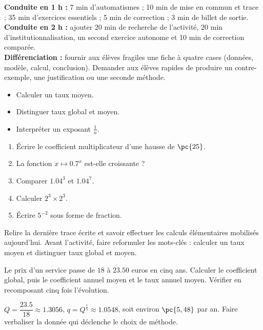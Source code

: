 \ifmxteacher
\begin{method}
\textbf{Conduite en 1 h :} 7 min d'automatismes ; 10 min de mise en commun et trace ; 35 min d'exercices essentiels ; 5 min de correction ; 3 min de billet de sortie.\\
\textbf{Conduite en 2 h :} ajouter 20 min de recherche de l'activité, 20 min d'institutionnalisation, un second exercice autonome et 10 min de correction comparée.\\
\textbf{Différenciation :} fournir aux élèves fragiles une fiche à quatre cases (données, modèle, calcul, conclusion). Demander aux élèves rapides de produire un contre-exemple, une justification ou une seconde méthode.
\end{method}
\fi
{}
\begin{objectives}\begin{itemize}\item Calculer un taux moyen.\item Distinguer taux global et moyen.\item Interpréter un exposant $\frac1n$.\end{itemize}\end{objectives}
\begin{fluency}\begin{enumerate}\item Écrire le coefficient multiplicateur d'une hausse de $\pc{25}$. \item La fonction $x\mapsto\num{0,7}^x$ est-elle croissante ? \item Comparer $\num{1,04}^3$ et $\num{1,04}^7$. \item Calculer $2^3\times2^3$. \item Écrire $5^{-2}$ sous forme de fraction. \end{enumerate}\end{fluency}
\begin{prerequisites}Relire la dernière trace écrite et savoir effectuer les calculs élémentaires mobilisés aujourd'hui. Avant l'activité, faire reformuler les mots-clés : calculer un taux moyen et distinguer taux global et moyen.\end{prerequisites}

\begin{activity}
Le prix d'un service passe de $18$ à $\num{23,50}$ euros en cinq ans. Calculer le coefficient global, puis le coefficient annuel moyen et le taux annuel moyen. Vérifier en recomposant cinq fois l'évolution.

\end{activity}
\begin{solution}$Q=\dfrac{\num{23,5}}{18}\approx\num{1,3056}$, $q=Q^{\frac15}\approx\num{1,0548}$, soit environ $\pc{5,48}$ par an. Faire verbaliser la donnée qui déclenche le choix de méthode.\end{solution}

